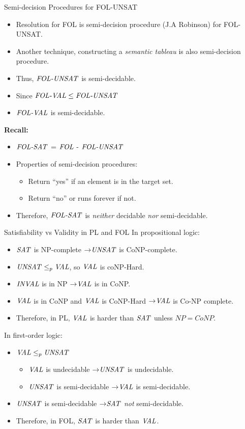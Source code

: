 \documentclass[style=sailor,size=12pt]{powerdot}
\begin{document}
\begin{wideslide}[bm=,toc=]{Semi-decision Procedures for FOL-UNSAT}
\begin{itemize}
\item Resolution for FOL is semi-decision procedure (J.A Robinson) for FOL-UNSAT.
\item Another technique, constructing a \emph{semantic tableau} is also
semi-decision procedure.
\item Thus, $\mbox{\it FOL-UNSAT\/}$ is semi-decidable.
\item Since $\mbox{\it FOL-VAL\/} \leq \mbox{\it FOL-UNSAT\/}$ 
\item $\mbox{\it FOL-VAL\/}$ is semi-decidable. 
\end{itemize}
{\bf Recall:} 
\begin{itemize}
\item $\mbox{\it FOL-SAT\/}$ = $\mbox{\it FOL\/}$ - $\mbox{\it FOL-UNSAT\/}$
\item Properties of semi-decision procedures:
\begin{itemize}
\item Return ``yes'' if an element is in the target set.
\item Return ``no'' or runs forever if not.
\end{itemize}
\item Therefore, $\mbox{\it FOL-SAT\/}$ is \emph{neither} decidable \emph{nor}
semi-decidable.
\end{itemize}

\end{wideslide}

\begin{wideslide}[bm=,toc=]{Satisfiability vs Validity in PL and FOL}
In propositional logic:
\begin{itemize}
\item $\mbox{\it SAT\/}$ is NP-complete $\mathbin{\rightarrow} \mbox{\it UNSAT\/}$ is CoNP-complete. 
\item $\mbox{\it UNSAT\/} \leq_p \mbox{\it VAL\/}$, so $\mbox{\it VAL\/}$ is coNP-Hard.
\item $\mbox{\it INVAL\/}$ is in NP $\mathbin{\rightarrow} \mbox{\it VAL\/}$ is in CoNP.
\item $\mbox{\it VAL\/}$ is in CoNP and $\mbox{\it VAL\/}$ is CoNP-Hard $\mathbin{\rightarrow} \mbox{\it VAL\/}$ is Co-NP
complete.
\item Therefore, in PL, $\mbox{\it VAL\/}$ is harder than $\mbox{\it SAT\/}$ unless $NP = CoNP$.
\end{itemize}
In first-order logic:
\begin{itemize}
\item $\mbox{\it VAL\/} \leq_p \mbox{\it UNSAT\/}$
\begin{itemize}
\item $\mbox{\it VAL\/}$ is undecidable $\mathbin{\rightarrow} \mbox{\it UNSAT\/}$ is undecidable. 
\item $\mbox{\it UNSAT\/}$ is semi-decidable $\mathbin{\rightarrow} \mbox{\it VAL\/}$ is semi-decidable. 
\end{itemize}
\item $\mbox{\it UNSAT\/}$ is semi-decidable $\mathbin{\rightarrow} \mbox{\it SAT\/}$ \emph{not} semi-decidable. 
\item Therefore, in FOL, $\mbox{\it SAT\/}$ is harder than $\mbox{\it VAL\/}$.
\end{itemize}
\end{wideslide}
\end{document}

